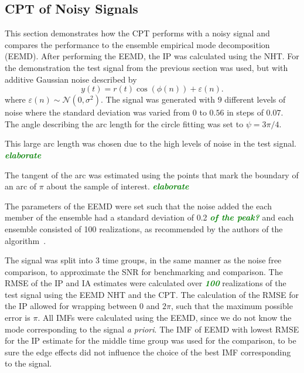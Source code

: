 \documentclass[a4paper]{IEEEtran}
\newcommand{\dean}[1]{\textsf{\emph{\textbf{\textcolor{green}{#1}}}}}
\begin{document}
% 

\subsection{CPT of Noisy Signals}\label{sect:NoisySignalsSection}
This section demonstrates how the CPT performs with a noisy signal and compares the performance to the ensemble empirical mode decomposition (EEMD). After performing the EEMD, the IP was calculated using the NHT. For the demonstration the test signal from the previous section was used, but with additive Gaussian noise described by
\begin{equation}
    y(t)=r\left(t\right)\cos\left(\phi\left(n\right)\right) + \varepsilon \left( n \right).
\end{equation}
where $\varepsilon(n) \sim \mathcal{N}(0,\sigma^2)$. The signal was generated with $9$ different levels of noise where the standard deviation was varied from $0$ to $0.56$ in steps of $0.07$. The angle describing the arc length for the circle fitting was set to $\psi=3\pi/4$. 

This large arc length was chosen due to the high levels of noise in the test signal. \dean{elaborate}

The tangent of the arc was estimated using the points that mark the boundary of an arc of $\pi$ about the sample of interest. \dean{elaborate}

The parameters of the EEMD were set such that the noise added the each member of the ensemble had a standard deviation of 0.2 \dean{of the peak?} and each ensemble consisted of 100 realizations, as recommended by the authors of the algorithm~\cite{Wu2009}.

The signal was split into $3$ time groups, in the same manner as the noise free comparison, to approximate the SNR for benchmarking and comparison. The RMSE of the IP and IA estimates were calculated over \dean{100} realizations of the test signal using the EEMD NHT and the CPT. The calculation of the RMSE for the IP allowed for wrapping between $0$ and $2\pi$, such that the maximum possible error is $\pi$. All IMFs were calculated using the EEMD, since we do not know the mode corresponding to the signal \emph{a priori}. The IMF of EEMD with lowest RMSE for the IP estimate for the middle time group was used for the comparison, to be sure the edge effects did not influence the choice of the best IMF corresponding to the signal. 
\end{document}
